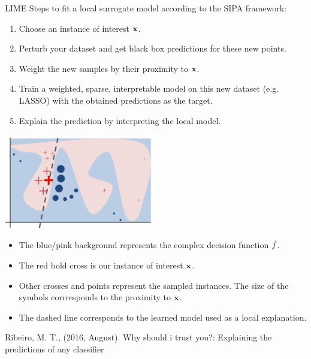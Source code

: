 \documentclass[11pt,compress,t,notes=noshow, xcolor=table]{beamer}
\begin{document}
\begin{vbframe}{LIME}
\normalsize
Steps to fit a local surrogate model according to the SIPA framework:
\begin{enumerate}
  \item Choose an instance of interest $\xv$. 
  \item Perturb your dataset and get black box predictions for these new points. 
  \item Weight the new samples by their proximity to $\xv$.
  \item Train a weighted, sparse, interpretable model on this new dataset (e.g. LASSO) with the obtained predictions as the target.
  \item Explain the prediction by interpreting the local model. 
\end{enumerate}

\framebreak

\begin{center}
 \includegraphics[width=0.5\textwidth]{figure/lime}
\end{center}
\begin{itemize}
  \item The blue/pink background represents the complex decision function $\fh$.
  \item The red bold cross is our instance of interest $\xv$.
  \item Other crosses and points represent the sampled instances. The size of the symbols corrresponds to the proximity to $\xv$.
  \item The dashed line corresponds to the learned model used as a local explanation.
\end{itemize}
{\tiny{Ribeiro, M. T., (2016, August). Why should i trust you?: Explaining the predictions of any classifier}}
\end{vbframe}
\end{document}
